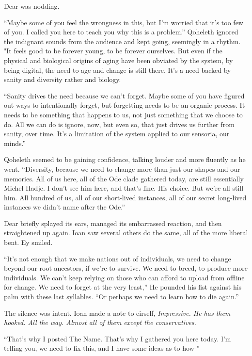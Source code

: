 Dear was nodding.

``Maybe some of you feel the wrongness in this, but I'm worried that it's too few of you. I called you here to teach you why this is a problem.'' Qoheleth ignored the indignant sounds from the audience and kept going, seemingly in a rhythm. "It feels good to be forever young, to be forever ourselves. But even if the physical and biological origins of aging have been obviated by the system, by being digital, the need to age and change is still there. It's a need backed by sanity and diversity rather and biology.

``Sanity drives the need because we can't forget. Maybe some of you have figured out ways to intentionally forget, but forgetting needs to be an organic process. It needs to be something that happens to us, not just something that we choose to do. All we can do is ignore, now, but even so, that just drives us further from sanity, over time. It's a limitation of the system applied to our sensoria, our minds.''

Qoheleth seemed to be gaining confidence, talking louder and more fluently as he went. ``Diversity, because we need to change more than just our shapes and our memories. All of us here, all of the Ode clade gathered today, are still essentially Michel Hadje. I don't see him here, and that's fine. His choice. But we're all still him. All hundred of us, all of our short-lived instances, all of our secret long-lived instances we didn't name after the Ode.''

Dear briefly splayed its ears, managed its embarrassed reaction, and then straightened up again. Ioan saw several others do the same, all of the more liberal bent. Ey smiled.

``It's not enough that we make nations out of individuals, we need to change beyond our root ancestors, if we're to survive. We need to breed, to produce more individuals. We can't keep relying on those who can afford to upload from offline for change. We need to forget at the very least,'' He pounded his fist against his palm with these last syllables. ``Or perhaps we need to learn how to die again.''

The silence was intent. Ioan made a note to eirself, \emph{Impressive. He has them hooked. All the way. Almost all of them except the conservatives.}

``That's why I posted The Name. That's why I gathered you here today. I'm telling you, we need to fix this, and I have some ideas as to how-''

